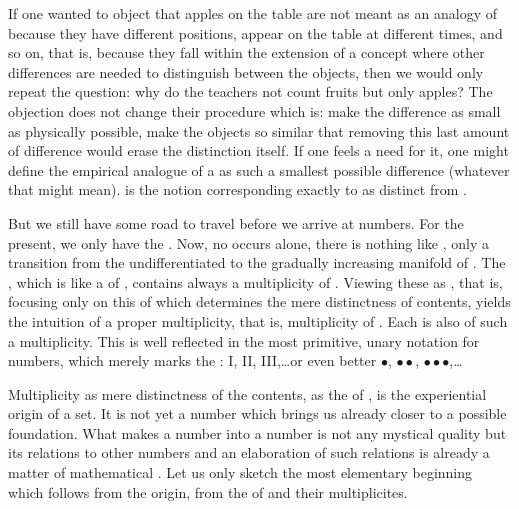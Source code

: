 If one wanted to object that apples on the table are not meant as an analogy of
 because they have different positions, appear on the table
at different times, and so on, that is, because they fall within the extension
of a concept where other differences are needed to distinguish between the
objects, then we would only repeat the question: why do the teachers not count
fruits but only apples?  The objection does not change their procedure which is:
make the difference as small as physically possible, make the objects so similar
that removing this last amount of difference would erase the distinction itself.
If one feels a need for it, one might define the empirical analogue of a
 as such a smallest possible difference (whatever that
might mean).  is the notion corresponding exactly to
 as distinct from .

\pa\label{pa:numbers} But we still have some road to travel before we arrive at
numbers.  For the present, we only have the . Now, no
 occurs alone, there is nothing like , only a transition from the undifferentiated  to the
gradually increasing manifold of . The \hoa, which is like a
 of , contains always a multiplicity of
. Viewing these as , that is, focusing
only on this  of  which determines the mere
distinctness of  contents, yields the intuition of a proper
multiplicity, that is, multiplicity of . Each  is also  of such a multiplicity. This is well
reflected in the most primitive, unary notation for numbers, which merely marks
the : I, II, III,\ldots or even better $\bullet$,
$\bullet\bullet$, $\bullet\bullet\bullet$,\ldots

Multiplicity as mere distinctness of the  contents, as the
   of , is the experiential
origin of a set. It is not yet a number which brings us already closer to a
possible foundation.  What makes a number into a number is not any mystical
quality but its relations to other numbers
and an elaboration of such relations is already a matter of mathematical
.  Let us only sketch the most elementary beginning which follows
from the origin, from the  of  and their
multiplicites.

